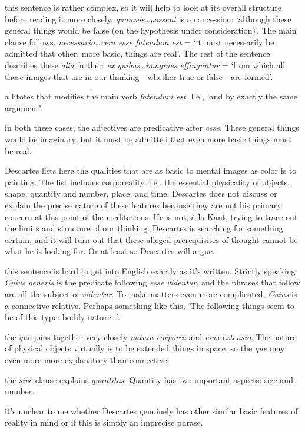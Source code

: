 \prenotes

 this sentence is rather complex, so it will help to look at its overall structure before reading it more closely. \textit{quamvis\dots possent} is a concession: `although these general things would be false (on the hypothesis under consideration)'. The main clause follows. \textit{necessario\dots vera esse fatendum est} = `it must necessarily be admitted that other, more basic, things are real'. The rest of the sentence describes these \textit{alia} further: \textit{ex quibus\dots imagines effinguntur} = `from which all those images that are in our thinking---whether true or false---are formed'.

 a litotes that modifies the main verb \textit{fatendum est}. I.e., `and by exactly the same argument'.

 in both these cases, the adjectives are predicative after \textit{esse}. These general things would be imaginary, but it must be admitted that even more basic things must be real.

Descartes lists here the qualities that are as basic to mental images as color is to painting. The list includes corporeality, i.e., the essential physicality of objects, shape, quantity and number, place, and time. Descartes does not discuss or explain the precise nature of these features because they are not his primary concern at this point of the meditations. He is not, à la Kant, trying to trace out the limits and structure of our thinking. Descartes is searching for something certain, and it will turn out that these alleged prerequisites of thought cannot be what he is looking for. Or at least so Descartes will argue.

 this sentence is hard to get into English exactly as it's written. Strictly speaking \textit{Cuius generis} is the predicate following \textit{esse videntur}, and the phrases that follow are all the subject of \textit{videntur}. To make matters even more complicated, \textit{Cuius} is a connective relative. Perhaps something like this, `The following things seem to be of this type: bodily nature\dots'.

 the \textit{que} joins together very closely \textit{natura corporea} and \textit{eius extensio}. The nature of physical objects virtually is to be extended things in space, so the \textit{que} may even more more explanatory than connective.

 the \textit{sive} clause explains \textit{quantitas}. Quantity has two important aspects: size and number.

 it's unclear to me whether Descartes genuinely has other similar basic features of reality in mind or if this is simply an imprecise phrase.

